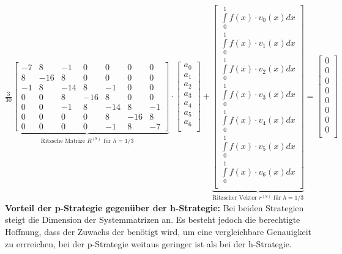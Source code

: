 $\underset{\text{Ritzsche Matrize $R^{(8)}$ für } h=1/3}{\underbrace{\frac{3}{30}\begin{bmatrix}
	-7& 8 & -1& 0& 0& 0& 0\\
	 8& -16& 8& 0& 0& 0& 0\\
	-1& 8& -14& 8& -1& 0& 0\\ 
	 0& 0& 8& -16& 8& 0& 0\\
	 0& 0& -1& 8& -14& 8& -1\\ 
	 0& 0& 0& 0& 8& -16& 8\\
	 0& 0& 0& 0& -1& 8& -7	
\end{bmatrix}}}\cdot\begin{bmatrix}
	a_0\\
	a_1\\
	a_2\\
	a_3\\
	a_4\\
	a_5\\
	a_6\\
\end{bmatrix}
+\underset{\text{Ritzscher Vektor $r^{(8)}$ für } h=1/3}{\underbrace{\begin{bmatrix}
	\int\limits_{0}^{1}{f(x)\cdot v_0(x)dx}\\
	\int\limits_{0}^{1}{f(x)\cdot v_1(x)dx}\\
	\int\limits_{0}^{1}{f(x)\cdot v_2(x)dx}\\
	\int\limits_{0}^{1}{f(x)\cdot v_3(x)dx}\\
	\int\limits_{0}^{1}{f(x)\cdot v_4(x)dx}\\
	\int\limits_{0}^{1}{f(x)\cdot v_5(x)dx}\\
	\int\limits_{0}^{1}{f(x)\cdot v_6(x)dx}\\
\end{bmatrix}}}=
\begin{bmatrix}
	0\\
	0\\
	0\\
	0\\
	0\\
	0\\
	0\\
	0\\
\end{bmatrix}
$\\

\textbf{Vorteil der p-Strategie gegenüber der h-Strategie:} Bei beiden Strategien steigt die Dimension der Systemmatrizen an. Es besteht jedoch die berechtigte Hoffnung, dass der Zuwachs der benötigt wird, um eine vergleichbare Genauigkeit zu errreichen, bei der p-Strategie weitaus geringer ist als bei der h-Strategie. 

